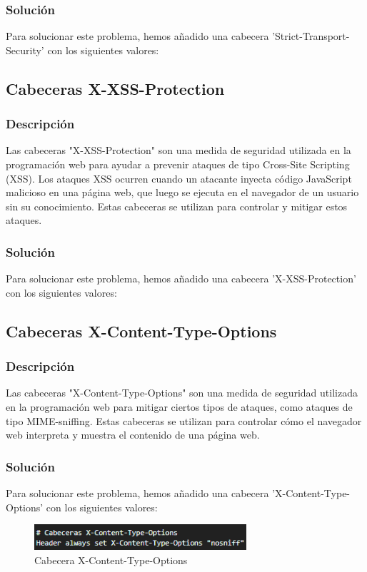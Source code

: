 \documentclass{report}
\begin{document}
                \subsubsection{Solución}
                    Para solucionar este problema, hemos añadido una cabecera 'Strict-Transport-Security' con los siguientes valores:
            \subsection{Cabeceras X-XSS-Protection}
                \subsubsection{Descripción}
                Las cabeceras "X-XSS-Protection" son una medida de seguridad utilizada en la programación web para ayudar a prevenir ataques de tipo Cross-Site Scripting (XSS). Los ataques XSS ocurren cuando un atacante inyecta código JavaScript malicioso en una página web, que luego se ejecuta en el navegador de un usuario sin su conocimiento. Estas cabeceras se utilizan para controlar y mitigar estos ataques.
                \subsubsection{Solución}
                    Para solucionar este problema, hemos añadido una cabecera 'X-XSS-Protection' con los siguientes valores:
            \subsection{Cabeceras X-Content-Type-Options}
                \subsubsection{Descripción}
                Las cabeceras "X-Content-Type-Options" son una medida de seguridad utilizada en la programación web para mitigar ciertos tipos de ataques, como ataques de tipo MIME-sniffing. Estas cabeceras se utilizan para controlar cómo el navegador web interpreta y muestra el contenido de una página web.
                \subsubsection{Solución}
                    Para solucionar este problema, hemos añadido una cabecera 'X-Content-Type-Options' con los siguientes valores:
                    \begin{figure}[H]
                        \centering
                        \includegraphics[width=0.7\textwidth]{./img/vulnerabilidades/3.5.7.1.png}
                        \caption{Cabecera X-Content-Type-Options}
                    \end{figure}
\end{document}
